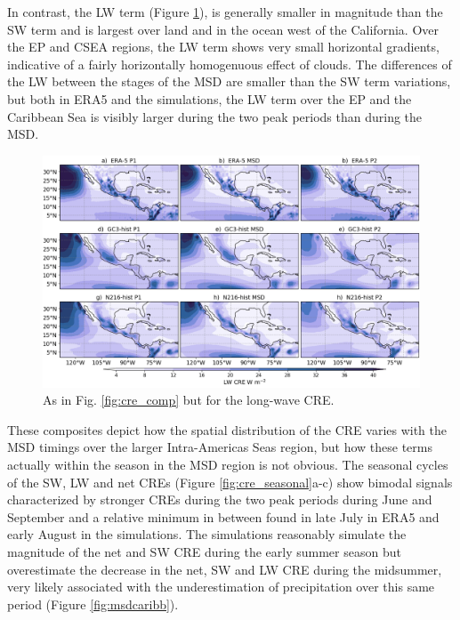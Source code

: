 In contrast, the LW term (Figure \ref{fig:lw_comp}), is generally smaller in magnitude than the SW term and is largest over land and in the ocean west of the California. Over the EP and CSEA regions, the LW term shows very small horizontal gradients, indicative of a fairly horizontally homogenuous effect of clouds. 
The differences of the LW between the stages of the MSD are smaller than the SW term variations, but both in ERA5 and the simulations, the LW term over the EP and the Caribbean Sea is visibly larger during the two peak periods than during the MSD. 

\begin{figure}[t!]
\includegraphics[width=\linewidth]{figures/fig4_lwclim_3.png}
\caption{As in Fig. \ref{fig:cre_comp} but for the long-wave CRE.}
\label{fig:lw_comp}
\end{figure}

These composites depict how the spatial distribution of the CRE varies with the MSD timings over the larger Intra-Americas Seas region, but how these terms actually within the season in the MSD region is not obvious. The seasonal cycles of the SW, LW and net CREs (Figure \ref{fig:cre_seasonal}a-c) show bimodal signals characterized by stronger CREs during the two peak periods during June and September and a relative minimum in between found in late July in ERA5 and early August in the simulations. The simulations reasonably simulate the magnitude of the net and SW CRE during the early summer season but overestimate the decrease in the net, SW and LW CRE during the midsummer, very likely associated with the underestimation of precipitation over this same period (Figure \ref{fig:msdcaribb}).

